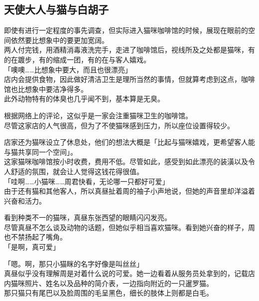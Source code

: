 \subsection{天使大人与猫与白胡子}

即使有进行一定程度的事先调查，但实际进入猫咪咖啡馆的时候，展现在眼前的空间依然要比想象中的要更加宽阔。\\

两人付完钱，用酒精消毒液洗完手，走进了咖啡馆后，视线所及之处都是猫咪，有的在踱步，有的缩成一团，有的在与客人嬉戏。\\

「噢噢……比想象中要大，而且也很漂亮」\\

店内会提供食物，因此做好清洁卫生是理所当然的事情，但就算考虑到这点，咖啡馆也比想象中要洁净得多。\\

此外动物特有的体臭也几乎闻不到，基本算是无臭。

根据网络上的评论，这似乎是一家会注重猫咪卫生的咖啡馆。\\

尽管这家店的人气很高，但为了不使猫咪感到压力，所以座位设置得较少。

店家还为猫咪设立了休息处，他们的想法大概是「比起与猫咪嬉戏，更希望客人能与猫共享同一个空间」。\\

这家猫咪咖啡馆按小时收费，费用不低。尽管如此，感受到如此漂亮的装潢以及令人舒适的氛围，就会让人觉得这钱花得很值。\\

「哇啊……小猫咪……周君快看，无论哪一只都好可爱」\\

由于还有猫和其他客人，所以真昼扯着周的袖子小声地说，但她的声音里却洋溢着兴奋和活力。

看到种类不一的猫咪，真昼东张西望的眼睛闪闪发亮。\\

尽管真昼不怎么谈及动物的话题，但她似乎相当喜欢猫咪。看到她兴奋的样子，周也不禁扬起了嘴角。\\

「是啊，真可爱」

「嗯。啊，那只小猫眯的名字好像是叫丝丝」\\

真昼似乎没有理解周是对着什么说的可爱。她一边看着从服务员处拿到的，记载店内猫咪照片、姓名以及品种的简介表，一边指向附近的一只暹罗猫。\\

那只猫只有尾巴以及脸周围的毛呈黑色，细长的肢体上则都是白毛。


